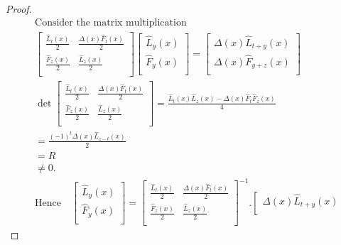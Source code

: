 \begin{proof}
\begin{align*}
&\text{Consider the matrix multiplication }\\
&{\left[
 \begin{array}{cc}
    \frac{\widehat{L}_{t}(x)}{2} & \frac{\Delta(x) \widehat{F}_{t}(x)}{2} \\
    \frac{\widehat{F}_{z}(x)}{2} & \frac{\widehat{L}_{z}(x)}{2} \\
	\end{array}
	\right]}{\left[
 \begin{array}{c}
    \widehat{L}_{y}(x) \\
    \widehat{F}_{y}(x) \\
	\end{array}
	\right]}={\left[
 \begin{array}{c}
    \Delta(x) \widehat{L}_{t+y}(x) \\
    \Delta(x) \widehat{F}_{y+z}(x) \\
	\end{array}
	\right]}\\
		&\det{\left[
 \begin{array}{cc}
    \frac{\widehat{L}_{t}(x)}{2} & \frac{\Delta(x) \widehat{F}_{t}(x)}{2} \\
    \frac{\widehat{F}_{z}(x)}{2} & \frac{\widehat{L}_{z}(x)}{2} \\
	\end{array}
	\right]}=\frac{\widehat{L}_{t}(x)\widehat{L}_{z}(x)-\Delta(x) \widehat{F}_{t}\widehat{F}_{z}(x)}{4}\\
					&=\frac{(-1)^t\Delta(x) \widehat{L}_{z-t}(x)}{2}\\
					&=R\\
					&\neq  0.\\
		&\text{Hence}\quad
{\left[
 \begin{array}{c}
    \widehat{L}_{y}(x) \\
    \widehat{F}_{y}(x) \\
	\end{array}
	\right]}={\left[
 \begin{array}{cc}
    \frac{\widehat{L}_{t}(x)}{2} & \frac{\Delta(x) \widehat{F}_{t}(x)}{2} \\
    \frac{\widehat{F}_{z}(x)}{2} & \frac{\widehat{L}_{z}(x)}{2} \\
	\end{array}
	\right]^{-1}}.{\left[
 \begin{array}{c}
    \Delta(x) \widehat{L}_{t+y}(x) \\

\end{array}}
\end{align*}
\end{proof}
